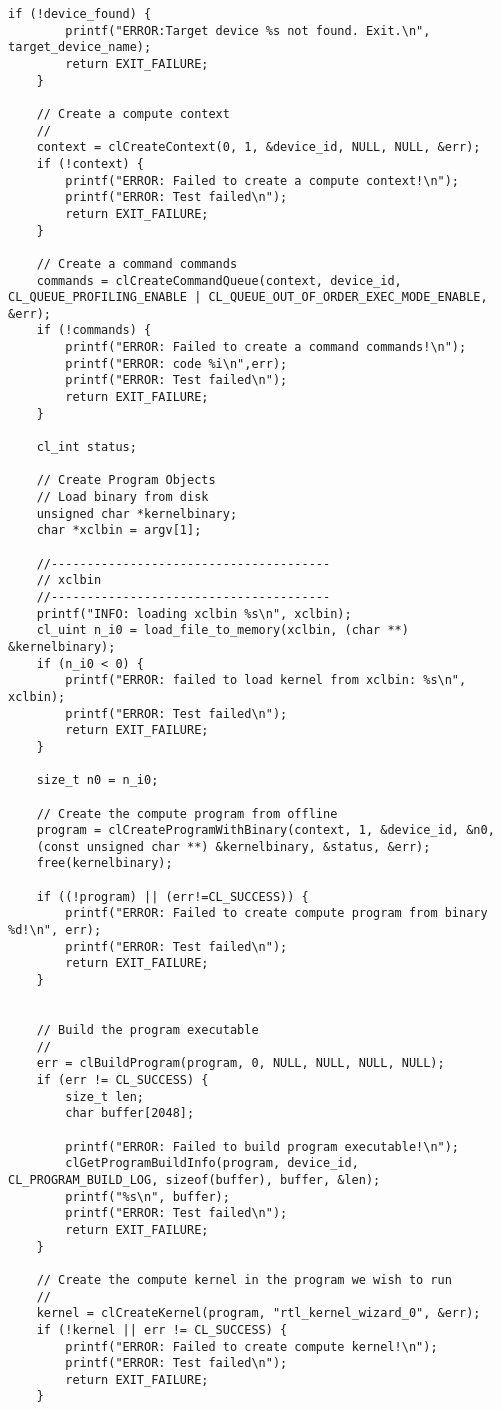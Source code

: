 \begin{lstlisting}[label=lst:code_1,caption=Содержимое файла host\_example.cpp]
	if (!device_found) {
		printf("ERROR:Target device %s not found. Exit.\n", target_device_name);
		return EXIT_FAILURE;
	}
	
	// Create a compute context
	//
	context = clCreateContext(0, 1, &device_id, NULL, NULL, &err);
	if (!context) {
		printf("ERROR: Failed to create a compute context!\n");
		printf("ERROR: Test failed\n");
		return EXIT_FAILURE;
	}
	
	// Create a command commands
	commands = clCreateCommandQueue(context, device_id, CL_QUEUE_PROFILING_ENABLE | CL_QUEUE_OUT_OF_ORDER_EXEC_MODE_ENABLE, &err);
	if (!commands) {
		printf("ERROR: Failed to create a command commands!\n");
		printf("ERROR: code %i\n",err);
		printf("ERROR: Test failed\n");
		return EXIT_FAILURE;
	}
	
	cl_int status;
	
	// Create Program Objects
	// Load binary from disk
	unsigned char *kernelbinary;
	char *xclbin = argv[1];
	
	//---------------------------------------
	// xclbin
	//---------------------------------------
	printf("INFO: loading xclbin %s\n", xclbin);
	cl_uint n_i0 = load_file_to_memory(xclbin, (char **) &kernelbinary);
	if (n_i0 < 0) {
		printf("ERROR: failed to load kernel from xclbin: %s\n", xclbin);
		printf("ERROR: Test failed\n");
		return EXIT_FAILURE;
	}
	
	size_t n0 = n_i0;
	
	// Create the compute program from offline
	program = clCreateProgramWithBinary(context, 1, &device_id, &n0,
	(const unsigned char **) &kernelbinary, &status, &err);
	free(kernelbinary);
	
	if ((!program) || (err!=CL_SUCCESS)) {
		printf("ERROR: Failed to create compute program from binary %d!\n", err);
		printf("ERROR: Test failed\n");
		return EXIT_FAILURE;
	}
	
	
	// Build the program executable
	//
	err = clBuildProgram(program, 0, NULL, NULL, NULL, NULL);
	if (err != CL_SUCCESS) {
		size_t len;
		char buffer[2048];
		
		printf("ERROR: Failed to build program executable!\n");
		clGetProgramBuildInfo(program, device_id, CL_PROGRAM_BUILD_LOG, sizeof(buffer), buffer, &len);
		printf("%s\n", buffer);
		printf("ERROR: Test failed\n");
		return EXIT_FAILURE;
	}
	
	// Create the compute kernel in the program we wish to run
	//
	kernel = clCreateKernel(program, "rtl_kernel_wizard_0", &err);
	if (!kernel || err != CL_SUCCESS) {
		printf("ERROR: Failed to create compute kernel!\n");
		printf("ERROR: Test failed\n");
		return EXIT_FAILURE;
	}
	

\end{lstlisting}

